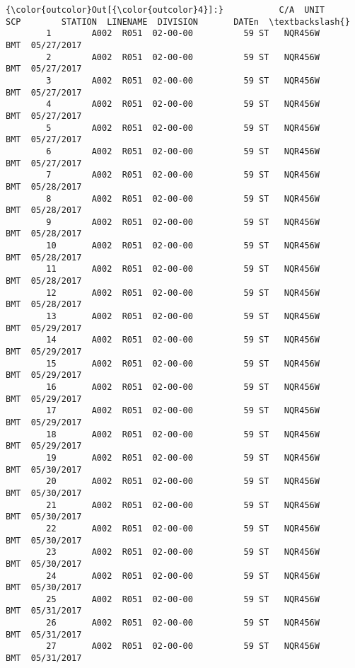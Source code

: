 \documentclass[11pt]{article}
\begin{document}
\begin{Verbatim}[commandchars=\\\{\}]
{\color{outcolor}Out[{\color{outcolor}4}]:}           C/A  UNIT       SCP        STATION  LINENAME  DIVISION       DATEn  \textbackslash{}
        1        A002  R051  02-00-00          59 ST   NQR456W       BMT  05/27/2017   
        2        A002  R051  02-00-00          59 ST   NQR456W       BMT  05/27/2017   
        3        A002  R051  02-00-00          59 ST   NQR456W       BMT  05/27/2017   
        4        A002  R051  02-00-00          59 ST   NQR456W       BMT  05/27/2017   
        5        A002  R051  02-00-00          59 ST   NQR456W       BMT  05/27/2017   
        6        A002  R051  02-00-00          59 ST   NQR456W       BMT  05/27/2017   
        7        A002  R051  02-00-00          59 ST   NQR456W       BMT  05/28/2017   
        8        A002  R051  02-00-00          59 ST   NQR456W       BMT  05/28/2017   
        9        A002  R051  02-00-00          59 ST   NQR456W       BMT  05/28/2017   
        10       A002  R051  02-00-00          59 ST   NQR456W       BMT  05/28/2017   
        11       A002  R051  02-00-00          59 ST   NQR456W       BMT  05/28/2017   
        12       A002  R051  02-00-00          59 ST   NQR456W       BMT  05/28/2017   
        13       A002  R051  02-00-00          59 ST   NQR456W       BMT  05/29/2017   
        14       A002  R051  02-00-00          59 ST   NQR456W       BMT  05/29/2017   
        15       A002  R051  02-00-00          59 ST   NQR456W       BMT  05/29/2017   
        16       A002  R051  02-00-00          59 ST   NQR456W       BMT  05/29/2017   
        17       A002  R051  02-00-00          59 ST   NQR456W       BMT  05/29/2017   
        18       A002  R051  02-00-00          59 ST   NQR456W       BMT  05/29/2017   
        19       A002  R051  02-00-00          59 ST   NQR456W       BMT  05/30/2017   
        20       A002  R051  02-00-00          59 ST   NQR456W       BMT  05/30/2017   
        21       A002  R051  02-00-00          59 ST   NQR456W       BMT  05/30/2017   
        22       A002  R051  02-00-00          59 ST   NQR456W       BMT  05/30/2017   
        23       A002  R051  02-00-00          59 ST   NQR456W       BMT  05/30/2017   
        24       A002  R051  02-00-00          59 ST   NQR456W       BMT  05/30/2017   
        25       A002  R051  02-00-00          59 ST   NQR456W       BMT  05/31/2017   
        26       A002  R051  02-00-00          59 ST   NQR456W       BMT  05/31/2017   
        27       A002  R051  02-00-00          59 ST   NQR456W       BMT  05/31/2017   

\end{Verbatim}
\end{document}
